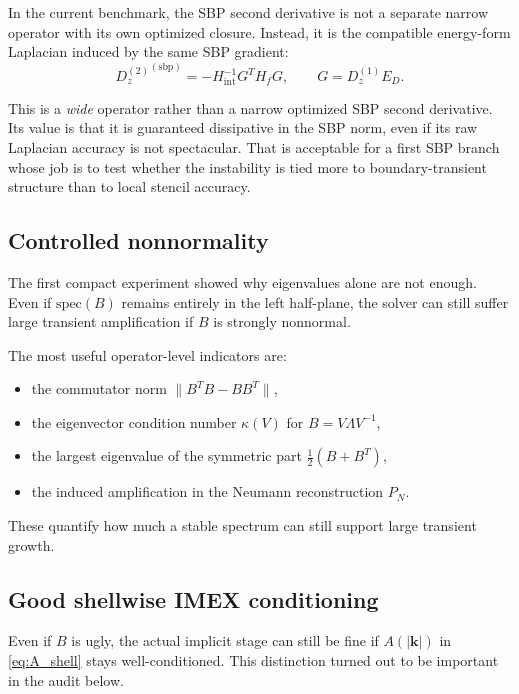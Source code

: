 \documentclass[11pt]{article}
\newcommand{\kh}{|\bm{k}|}
\newcommand{\Dzone}{D^{(1)}_z}
\newcommand{\Dztwo}{D^{(2)}_z}
\newcommand{\Hmat}{H}
\newcommand{\Emat}{E_D}
\newcommand{\Pmat}{P_N}
\newcommand{\Gmat}{G}
\begin{document}
In the current benchmark, the SBP second derivative is not a separate narrow
operator with its own optimized closure. Instead, it is the compatible
energy-form Laplacian induced by the same SBP gradient:
\begin{equation}
\boxed{
{\Dztwo}^{(\mathrm{sbp})}
=
-\Hmat_{\mathrm{int}}^{-1}\Gmat^T \Hmat_f \Gmat,
\qquad
\Gmat = \Dzone \Emat.
}
\label{eq:sbp42_d2}
\end{equation}

This is a \emph{wide} operator rather than a narrow optimized SBP second
derivative. Its value is that it is guaranteed dissipative in the SBP norm,
even if its raw Laplacian accuracy is not spectacular. That is acceptable for a
first SBP branch whose job is to test whether the instability is tied more to
boundary-transient structure than to local stencil accuracy.

\subsection{Controlled nonnormality}

The first compact experiment showed why eigenvalues alone are not enough.
Even if $\mathrm{spec}(B)$ remains entirely in the left half-plane, the solver
can still suffer large transient amplification if $B$ is strongly nonnormal.

The most useful operator-level indicators are:
\begin{itemize}[nosep]
\item the commutator norm
  $\|B^T B - B B^T\|$,
\item the eigenvector condition number $\kappa(V)$ for $B = V \Lambda V^{-1}$,
\item the largest eigenvalue of the symmetric part
  $\tfrac{1}{2}(B + B^T)$,
\item the induced amplification in the Neumann reconstruction $\Pmat$.
\end{itemize}

These quantify how much a stable spectrum can still support large transient
growth.

\subsection{Good shellwise IMEX conditioning}

Even if $B$ is ugly, the actual implicit stage can still be fine if $A(\kh)$ in
\eqref{eq:A_shell} stays well-conditioned. This distinction turned out to be
important in the audit below.
\end{document}
